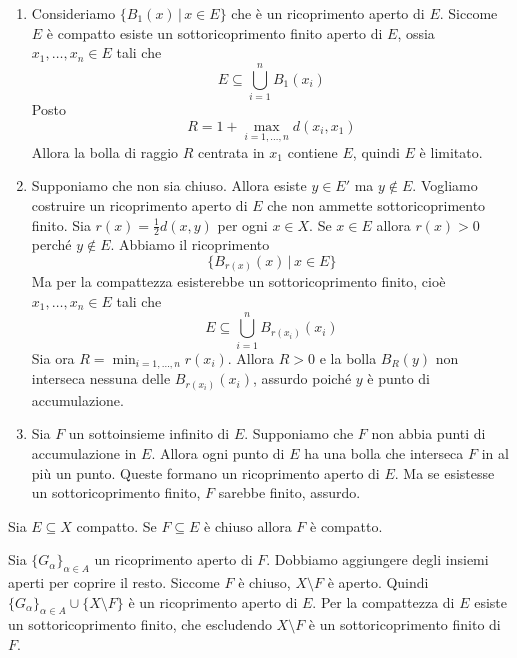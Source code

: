 \documentclass[a4paper]{article}
\begin{document}
\begin{snippetproof}{}
    \begin{enumerate}
        \item Consideriamo \(\{B_1(x) \,|\, x\in E\}\) che è un ricoprimento aperto di \(E\).
        Siccome \(E\) è compatto esiste un sottoricoprimento finito aperto di \(E\), ossia
        \(x_1, \ldots, x_n \in E\) tali che
        \[
            E \subseteq \bigcup_{i=1}^n B_1(x_i)
        \]
        Posto
        \[
            R = 1 + \max_{i=1,\ldots,n} d(x_i, x_1)
        \]
        Allora la bolla di raggio \(R\) centrata in \(x_1\) contiene \(E\), quindi \(E\) è limitato.
        \item Supponiamo che non sia chiuso. Allora esiste \(y\in E'\) ma \(y\notin E\).
        Vogliamo costruire un ricoprimento aperto di \(E\) che non ammette sottoricoprimento finito.
        Sia \(r(x) = \frac{1}{2} d(x,y)\) per ogni \(x\in X\).
        Se \(x\in E\) allora \(r(x) > 0\) perché \(y\notin E\).
        Abbiamo il ricoprimento
        \[
            \{B_{r(x)}(x) \,|\, x\in E\}
        \]
        Ma per la compattezza esisterebbe un sottoricoprimento finito, cioè \(x_1, \ldots, x_n \in E\) tali che
        \[
            E \subseteq \bigcup_{i=1}^n B_{r(x_i)}(x_i)
        \]
        Sia ora \(R = \min_{i=1,\ldots,n} r(x_i)\). Allora \(R > 0\) e la bolla \(B_R(y)\)
        non interseca nessuna delle \(B_{r(x_i)}(x_i)\), assurdo poiché \(y\) è punto di accumulazione.
        \item Sia \(F\) un sottoinsieme infinito di \(E\). Supponiamo che \(F\) non abbia punti di accumulazione in \(E\).
        Allora ogni punto di \(E\) ha una bolla che interseca \(F\) in al più un punto.
        Queste formano un ricoprimento aperto di \(E\).
        Ma se esistesse un sottoricoprimento finito, \(F\) sarebbe finito, assurdo.
    \end{enumerate}
\end{snippetproof}

\begin{snippetproposition}{}
    Sia \(E \subseteq X\) compatto. Se \(F \subseteq E\) è chiuso allora \(F\) è compatto.
\end{snippetproposition}
\begin{snippetproof}{}
    Sia \(\{G_\alpha\}_{\alpha \in A}\) un ricoprimento aperto di \(F\).
    Dobbiamo aggiungere degli insiemi aperti per coprire il resto.
    Siccome \(F\) è chiuso, \(X \setminus F\) è aperto.
    Quindi \(\{G_\alpha\}_{\alpha \in A} \cup \{X \setminus F\}\) è un ricoprimento aperto di \(E\).
    Per la compattezza di \(E\) esiste un sottoricoprimento finito, che escludendo \(X \setminus F\)
    è un sottoricoprimento finito di \(F\).
\end{snippetproof}
\end{document}
